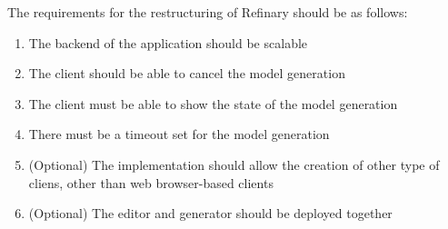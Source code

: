 The requirements for the restructuring of Refinary should be as follows:
\begin{enumerate}
        \item The backend of the application should be scalable 
        \item The client should be able to cancel the model generation
        \item The client must be able to show the state of the model generation  
        \item There must be a timeout set for the model generation
		\item (Optional) The implementation should allow the creation of other type of cliens,
		other than web browser-based clients
		\item (Optional) The editor and generator should be deployed together
\end{enumerate}

